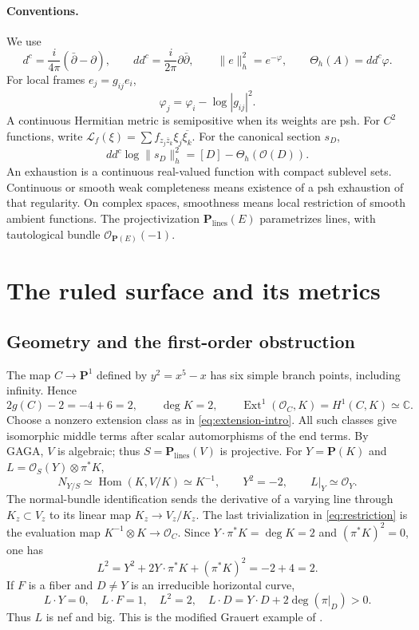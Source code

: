 \documentclass[11pt]{amsart}
\theoremstyle{definition}
\theoremstyle{remark}
\numberwithin{equation}{section}
\newcommand{\C}{\mathbb C}
\newcommand{\PP}{\mathbf P}
\newcommand{\OO}{\mathcal O}
\newcommand{\ddc}{dd^c}
\newcommand{\Levi}{\mathcal L}
\newcommand{\barp}{\bar\partial}
\begin{document}
\paragraph{Conventions.}\label{sec:conventions}
We use
\[
d^c=\frac{i}{4\pi}(\barp-\partial),\qquad
\ddc=\frac{i}{2\pi}\partial\barp,\qquad
\|e\|_h^2=e^{-\varphi},\qquad\Theta_h(A)=\ddc\varphi.
\]
For local frames $e_j=g_{ij}e_i$,
\begin{equation}\label{eq:metric-transition}
\varphi_j=\varphi_i-\log|g_{ij}|^2.
\end{equation}
A continuous Hermitian metric is semipositive when its weights are
psh. For $C^2$ functions, write
$\Levi_f(\xi)=\sum f_{z_j\bar z_k}\xi_j\overline{\xi_k}$.
For the canonical section $s_D$,
\begin{equation}\label{eq:PL}
\ddc\log\|s_D\|_h^2=[D]-\Theta_h(\OO(D)).
\end{equation}
An exhaustion is a continuous real-valued function with compact
sublevel sets. Continuous or smooth weak completeness means existence
of a psh exhaustion of that regularity. On complex spaces, smoothness
means local restriction of smooth ambient functions.
The projectivization $\PP_{\mathrm{lines}}(E)$ parametrizes lines,
with tautological bundle $\OO_{\PP(E)}(-1)$.

\section{The ruled surface and its metrics}\label{sec:metrics}

\subsection{Geometry and the first-order obstruction}\label{sec:ruled}

The map $C\to\PP^1$ defined by $y^2=x^5-x$ has six simple branch
points, including infinity. Hence
\[
 2g(C)-2=-4+6=2,\qquad \deg K=2,\qquad
 \operatorname{Ext}^1(\OO_C,K)=H^1(C,K)\simeq\C.
\]
Choose a nonzero extension class as in \eqref{eq:extension-intro}.
All such classes give isomorphic middle terms after scalar
automorphisms of the end terms. By GAGA, $V$ is algebraic; thus
$S=\PP_{\mathrm{lines}}(V)$ is projective. For $Y=\PP(K)$ and
$L=\OO_S(Y)\otimes\pi^*K$,
\begin{equation}\label{eq:restriction}
 N_{Y/S}\simeq\operatorname{Hom}(K,V/K)\simeq K^{-1},\qquad
 Y^2=-2,\qquad L|_Y\simeq\OO_Y.
\end{equation}
The normal-bundle identification sends the derivative of a varying
line through $K_z\subset V_z$ to its linear map
$K_z\to V_z/K_z$. The last trivialization in
\eqref{eq:restriction} is the evaluation map
$K^{-1}\otimes K\to\OO_C$. Since
$Y\cdot\pi^*K=\deg K=2$ and $(\pi^*K)^2=0$, one has
\[
 L^2=Y^2+2Y\cdot\pi^*K+(\pi^*K)^2=-2+4=2.
\]
If $F$ is a fiber and $D\ne Y$ is an irreducible horizontal curve,
\[
 L\cdot Y=0,\quad L\cdot F=1,\quad L^2=2,\quad
 L\cdot D=Y\cdot D+2\deg(\pi|_D)>0.
\]
Thus $L$ is nef and big. This is the modified Grauert example of
\cite[Example~4.1]{Koike2021}.
\end{document}
